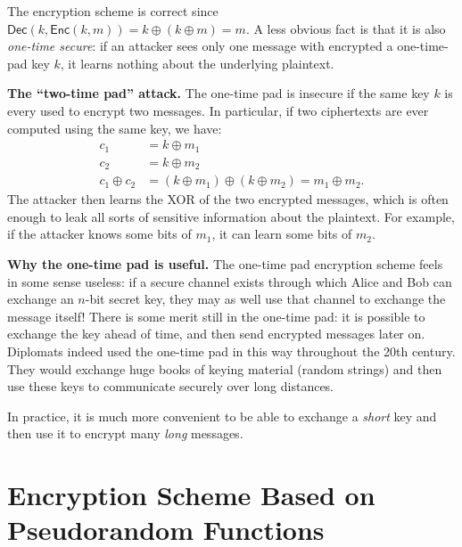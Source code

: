 \documentclass[
  letterpaper,
]{scrbook}
\newcommand{\xor}{\oplus}
\newcommand{\Enc}{\mathsf{Enc}}
\newcommand{\Dec}{\mathsf{Dec}}
\theoremstyle{definition}
\theoremstyle{plain}
\theoremstyle{plain}
\theoremstyle{remark}
\begin{document}
The encryption scheme is correct since
\(\Dec(k, \Enc(k, m)) = k \oplus (k \oplus m) = m\). A less obvious fact
is that it is also \emph{one-time secure}: if an attacker sees only one
message with encrypted a one-time-pad key \(k\), it learns nothing about
the underlying plaintext.


\textbf{The ``two-time pad'' attack.} The one-time pad is insecure if
the same key \(k\) is every used to encrypt two messages. In particular,
if two ciphertexts are ever computed using the same key, we have:
\[\begin{aligned}
  c_1 &= k \xor m_1 \\
  c_2 &= k \xor m_2 \\
  c_1 \oplus c_2 &= (k \xor m_1) \xor (k \xor m_2) = m_1 \xor m_2.
\end{aligned}\] The attacker then learns the XOR of the two encrypted
messages, which is often enough to leak all sorts of sensitive
information about the plaintext. For example, if the attacker knows some
bits of \(m_1\), it can learn some bits of \(m_2\).

\textbf{Why the one-time pad is useful.} The one-time pad encryption
scheme feels in some sense useless: if a secure channel exists through
which Alice and Bob can exchange an \(n\)-bit secret key, they may as
well use that channel to exchange the message itself! There is some
merit still in the one-time pad: it is possible to exchange the key
ahead of time, and then send encrypted messages later on. Diplomats
indeed used the one-time pad in this way throughout the 20th century.
They would exchange huge books of keying material (random strings) and
then use these keys to communicate securely over long distances.

In practice, it is much more convenient to be able to exchange a
\emph{short} key and then use it to encrypt many \emph{long} messages.

\section{Encryption Scheme Based on Pseudorandom
Functions}\label{sec-lec8-weakenc}
\end{document}
